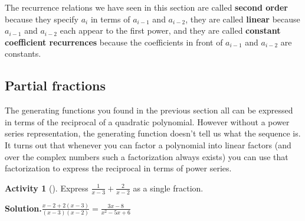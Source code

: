 \documentclass[10pt,]{book}
\newcommand{\terminology}[1]{\textbf{#1}}
\theoremstyle{plain}
\theoremstyle{definition}
\newtheorem{activity}[project]{Activity}
\numberwithin{equation}{chapter}
\begin{document}
The recurrence relations we have seen in this section are called \terminology{second order} because they specify \(a_i\) in terms of \(a_{i-1}\) and \(a_{i-2}\), they are called \terminology{linear} because \(a_{i-1}\) and \(a_{i-2}\) each appear to the first power, and they are called \terminology{constant coefficient recurrences} because the coefficients in front of \(a_{i-1}\) and \(a_{i-2}\) are constants.%
\typeout{************************************************}
\typeout{************************************************}
\subsection[{Partial fractions}]{Partial fractions}\label{subsection-49}
The generating functions you found in the previous section all can be expressed in terms of the reciprocal of a quadratic polynomial. However without a power series representation, the generating function doesn't tell us what the sequence is. It turns out that whenever you can factor a polynomial into linear factors (and over the complex numbers such a factorization always exists) you can use that factorization to express the reciprocal in terms of power series.%
\begin{activity}[]\label{simplifysumoffractions}
Express \(\frac{1}{x-3} + \frac{2}{x-2}\) as a single fraction.%
\par\medskip\noindent%
\textbf{Solution.}\quad \(\frac{x-2 +2(x-3)}{(x-3)(x-2)}=\frac{3x-8}{x^2-5x+6}\)%
\end{activity}
\end{document}
